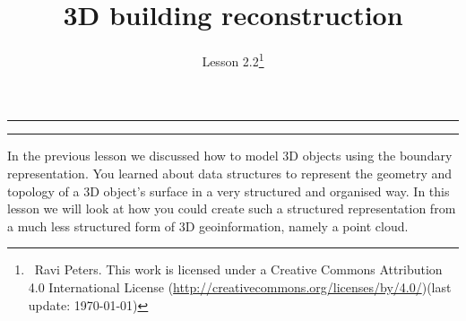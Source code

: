
\newcommand{\lessonNumber}{Lesson 2.2}

\newcommand{\Orient}{O\textsc{rient}\xspace}
\newcommand{\Insphere}{I\textsc{n}S\textsc{phere}\xspace}


\newtheorem{definition}{Definition}



\title{3D building reconstruction}

\ohead*{\lessonNumber}
\titlehead{\thispagestyle{headings}}
\author{\lessonNumber\footnote{\ccbysa\ Ravi Peters. This work is licensed under a Creative Commons Attribution 4.0 International License (\url{http://creativecommons.org/licenses/by/4.0/})\newline(last update: \today)}}
\date{}

\pagestyle{scrheadings}

\maketitle

\noindent\rule{5cm}{0.4pt}
\tableofcontents
\noindent\rule{5cm}{0.4pt}
\vspace{5mm}

In the previous lesson we discussed how to model 3D objects using the boundary representation.
You learned about data structures to represent the geometry and topology of a 3D object's surface in a very structured and organised way.
In this lesson we will look at how you could create such a structured representation from a much less structured form of 3D geoinformation, namely a point cloud.


